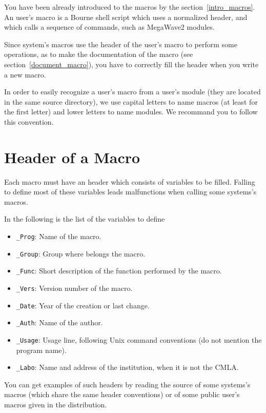 %
%

You have been already introduced to the macros by the 
section~\ref{intro_macros}.
An user's macro is a Bourne shell script which uses a normalized header,
and which calls a sequence of commands, such as MegaWave2 modules.

Since system's macros use the header of the user's macro to perform
some operations, as to make the documentation of the macro
(see section~\ref{document_macro}), you have to correctly fill the header 
when you write a new macro.

In order to easily recognize a user's macro from a user's module
(they are located in the same source directory), we use capital letters to 
name macros (at least for the first letter) and lower letters to name modules.
We recommand you to follow this convention.

\section{Header of a Macro}
\label{usermacros_header}

Each macro must have an header which consists of variables to be filled.
Falling to define most of these variables leads malfunctions when calling 
some systems's macros.

In the following is the list of the variables to define
\begin{itemize}
\item \verb+_Prog+: Name of the macro.
\item \verb+_Group+: Group where belongs the macro.
\item \verb+_Func+: Short description of the function performed by the macro.
\item \verb+_Vers+: Version number of the macro.
\item \verb+_Date+: Year of the creation or last change.
\item \verb+_Auth+: Name of the author.
\item \verb+_Usage+: Usage line, following Unix command conventions (do not
mention the program name).
\item \verb+_Labo+: Name and address of the institution, when it is not
the CMLA.
\end{itemize}

You can get examples of such headers by reading the source of some systems's 
macros (which share the same header conventions) or of some public user's
macros given in the distribution.

